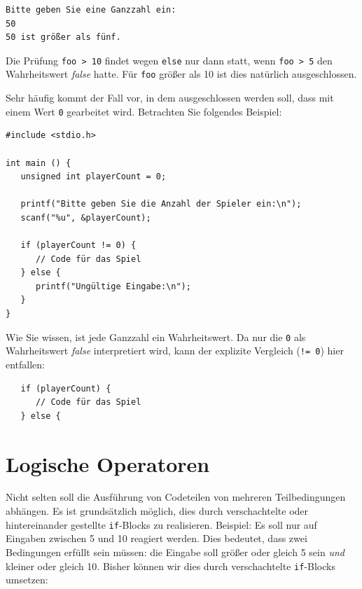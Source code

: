 \begin{cmdbox}
\begin{verbatim}
Bitte geben Sie eine Ganzzahl ein:
50
50 ist größer als fünf.
\end{verbatim}
\end{cmdbox}

Die Prüfung \texttt{foo > 10} findet wegen \texttt{else} nur dann statt, wenn \texttt{foo > 5} den Wahrheitswert \emph{false} hatte. Für \texttt{foo} größer als 10 ist dies natürlich ausgeschlossen.

\begin{hintbox}
Sehr häufig kommt der Fall vor, in dem ausgeschlossen werden soll, dass mit einem Wert \texttt{0} gearbeitet wird. Betrachten Sie folgendes Beispiel:

\begin{codebox}
\begin{verbatim}
#include <stdio.h>

int main () {
   unsigned int playerCount = 0;

   printf("Bitte geben Sie die Anzahl der Spieler ein:\n");
   scanf("%u", &playerCount);

   if (playerCount != 0) {
      // Code für das Spiel
   } else {
      printf("Ungültige Eingabe:\n");
   }
}
\end{verbatim}
\end{codebox}
\end{hintbox}
%
\begin{hintbox}[]
Wie Sie wissen, ist jede Ganzzahl ein Wahrheitswert. Da nur die \texttt{0} als Wahrheitswert \emph{false} interpretiert wird, kann der explizite Vergleich (\texttt{!= 0}) hier entfallen:

\begin{codebox}
\begin{verbatim}
   if (playerCount) {
      // Code für das Spiel
   } else {
\end{verbatim}
\end{codebox}
\end{hintbox}

\section{Logische Operatoren} \label{sec:OperatorsLogical}
Nicht selten soll die Ausführung von Codeteilen von mehreren Teilbedingungen abhängen. Es ist grundsätzlich möglich, dies durch verschachtelte oder hintereinander gestellte \texttt{if}-Blocks zu realisieren. Beispiel: Es soll nur auf Eingaben zwischen 5 und 10 reagiert werden. Dies bedeutet, dass zwei Bedingungen erfüllt sein müssen: die Eingabe soll größer oder gleich 5 sein \emph{und} kleiner oder gleich 10. Bisher können wir dies durch verschachtelte \texttt{if}-Blocks umsetzen:

